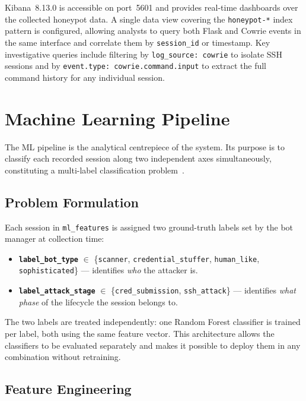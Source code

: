 Kibana~8.13.0 is accessible on port~5601 and provides real-time dashboards over
the collected honeypot data. A single data view covering the \texttt{honeypot-*}
index pattern is configured, allowing analysts to query both Flask and Cowrie
events in the same interface and correlate them by \texttt{session\_id} or
timestamp. Key investigative queries include filtering by
\texttt{log\_source: cowrie} to isolate SSH sessions and by
\texttt{event.type: cowrie.command.input} to extract the full command history
for any individual session.


\section{Machine Learning Pipeline}
\label{sec:ml_design}

The ML pipeline is the analytical centrepiece of the system. Its purpose is to
classify each recorded session along two independent axes simultaneously,
constituting a multi-label classification problem~\cite{MDR25}.

\subsection{Problem Formulation}

Each session in \texttt{ml\_features} is assigned two ground-truth labels set
by the bot manager at collection time:

\begin{itemize}
    \item \textbf{\texttt{label\_bot\_type}} $\in$ \{\texttt{scanner},
    \texttt{credential\_stuffer}, \texttt{human\_like},
    \texttt{sophisticated}\} — identifies \emph{who} the attacker is.
    \item \textbf{\texttt{label\_attack\_stage}} $\in$
    \{\texttt{cred\_submission}, \texttt{ssh\_attack}\} — identifies
    \emph{what phase} of the lifecycle the session belongs to.
\end{itemize}

The two labels are treated independently: one Random Forest classifier is
trained per label, both using the same feature vector. This architecture allows
the classifiers to be evaluated separately and makes it possible to deploy them
in any combination without retraining.

\subsection{Feature Engineering}

